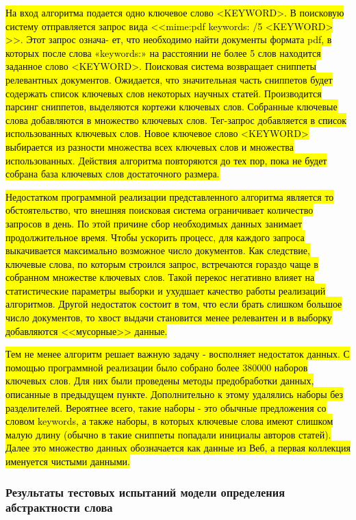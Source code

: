 \hl{На вход алгоритма подается одно ключевое слово <KEYWORD>. В поисковую систему отправляется запрос вида <<mime:pdf keywords: /5 <KEYWORD> >>. Этот запрос означа- ет, что необходимо найти документы формата pdf, в которых после слова «keywords:» на расстоянии не более 5 слов находится заданное слово <KEYWORD>. Поисковая система возвращает сниппеты релевантных документов. Ожидается, что значительная часть сниппетов будет содержать список ключевых слов некоторых научных статей. Производится парсинг сниппетов, выделяются кортежи ключевых слов. Собранные ключевые слова добавляются в множество ключевых слов. Тег-запрос добавляется в список использованных ключевых слов. Новое ключевое слово <KEYWORD> выбирается из разности множества всех ключевых слов и множества использованных. Действия алгоритма повторяются до тех пор, пока не будет собрана база ключевых слов достаточного размера.}

\hl{Недостатком программной реализации представленного алгоритма является то обстоятельство, что внешняя поисковая система ограничивает количество запросов в день. По этой причине сбор необходимых данных занимает продолжительное время. Чтобы ускорить процесс, для каждого запроса выкачивается максимально возможное число документов. Как следствие, ключевые слова, по которым строился запрос, встречаются гораздо чаще в собранном множестве ключевых слов. Такой перекос негативно влияет на статистические параметры выборки и ухудшает качество работы реализаций алгоритмов. Другой недостаток состоит в том, что если брать слишком большое число документов, то хвост выдачи становится менее релевантен и в выборку добавляются <<мусорные>> данные.}

\hl{Тем не менее алгоритм решает важную задачу - восполняет недостаток данных. С помощью программной реализации было собрано более 380000 наборов ключевых слов. Для них были проведены методы предобработки данных, описанные в предыдущем пункте. Дополнительно к этому удалялись наборы без разделителей. Вероятнее всего, такие наборы - это обычные предложения со словом keywords, а также наборы, в которых ключевые слова имеют слишком малую длину (обычно в такие сниппеты попадали инициалы авторов статей). Далее это множество данных обозначается как данные из Веб, а первая коллекция именуется чистыми данными.}

\subsubsection{Результаты тестовых испытаний модели определения абстрактности слова}

